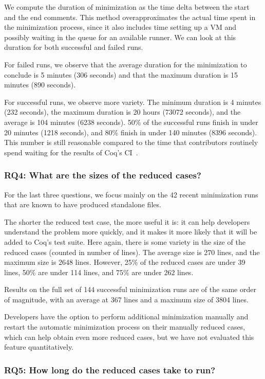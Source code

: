 \documentclass[a4paper,USenglish,cleveref,autoref,thm-restate,pdfa]{lipics-v2021}
\begin{document}
We compute the duration of minimization as the time delta between the start and the end comments.
This method overapproximates the actual time spent in the minimization process, since it also includes time setting up a VM and possibly waiting in the queue for an available runner.
%
We can look at this duration for both successful and failed runs.

For failed runs, we observe that the average duration for the minimization to conclude is 5 minutes (306 seconds) and that the maximum duration is 15 minutes (890 seconds).

For successful runs, we observe more variety. The minimum duration is 4 minutes (232 seconds), the maximum duration is 20 hours (73072 seconds), and the average is 104 minutes (6238 seconds). 50\% of the successful runs finish in under 20 minutes (1218 seconds), and 80\% finish in under 140 minutes (8396 seconds). This number is still reasonable compared to the time that contributors routinely spend waiting for the results of Coq's CI~\cite{zimmermann:tel-02451322}.

\subsubsection{RQ4: What are the sizes of the reduced cases?}

For the last three questions, we focus mainly on the 42 recent minimization runs that are known to have produced standalone files.

The shorter the reduced test case, the more useful it is: it can help developers understand the problem more quickly, and it makes it more likely that it will be added to Coq's test suite. Here again, there is some variety in the size of the reduced cases (counted in number of lines). The average size is 270 lines, and the maximum size is 2648 lines. However, 25\% of the reduced cases are under 39 lines, 50\% are under 114 lines, and 75\% are under 262 lines.

Results on the full set of 144 successful minimization runs are of the same order of magnitude, with an average at 367 lines and a maximum size of 3804 lines.

Developers have the option to perform additional minimization manually and restart the automatic minimization process on their manually reduced cases, which can help obtain even more reduced cases, but we have not evaluated this feature quantitatively.

\subsubsection{RQ5: How long do the reduced cases take to run?}
\end{document}
